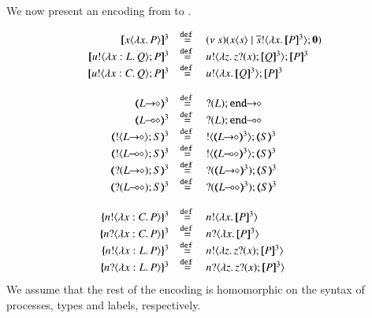 We now present an encoding from \HOpp to \HOp.

\[
\begin{array}{rcl}
	\pmap{\appl{x}{\abs{x} P}}{3} &\defeq& \newsp{s}{\appl{x}{s} \Par \bout{\dual{s}}{\abs{x} \pmap{P}{3}} \inact}
	\\
	\pmap{\bout{u}{\abs{x: L}{Q}} P}{3} &\defeq& \bout{u}{\abs{z}{\binp{z}{x} \pmap{Q}{3}}} \pmap{P}{3}
	\\
	\pmap{\bout{u}{\abs{x: C}{Q}} P}{3} &\defeq& \bout{u}{\abs{x}{\pmap{Q}{3}}} \pmap{P}{3}
	\\
	\\
	\tmap{\shot{L}}{3} &\defeq& \shot{\btinp{L} \tinact}
	\\
	\tmap{\lhot{L}}{3} &\defeq& \lhot{\btinp{L} \tinact}
	\\
	\tmap{\btout{\shot{L}} S}{3} &\defeq& \btout{\tmap{\shot{L}}{3}} \tmap{S}{3}
	\\
	\tmap{\btout{\lhot{L}} S}{3} &\defeq& \btout{\tmap{\lhot{L}}{3}} \tmap{S}{3}
	\\
	\tmap{\btinp{\shot{L}} S}{3} &\defeq& \btinp{\tmap{\shot{L}}{3}} \tmap{S}{3}
	\\
	\tmap{\btinp{\lhot{L}} S}{3} &\defeq& \btinp{\tmap{\lhot{L}}{3}} \tmap{S}{3}
	\\
	\\
	\mapa{\bactout{n}{\abs{x:C}{P}}}^{3} &\defeq& \bactout{n}{\abs{x}{\pmap{P}{3}}}
	\\
	\mapa{\bactinp{n}{\abs{x:C}{P}}}^{3} &\defeq& \bactinp{n}{\abs{x}{\pmap{P}{3}}}
	\\
	\mapa{\bactout{n}{\abs{x:L}{P}}}^{3} &\defeq& \bactout{n}{\abs{z}{\binp{z}{x} \pmap{P}{3}}}
	\\
	\mapa{\bactinp{n}{\abs{x:L}{P}}}^{3} &\defeq& \bactinp{n}{\abs{z}{\binp{z}{x} \pmap{P}{3}}}

\end{array}
\]
\noi We assume that the rest of the encoding is homomorphic on the syntax of
processes, types and labels, respectively.

